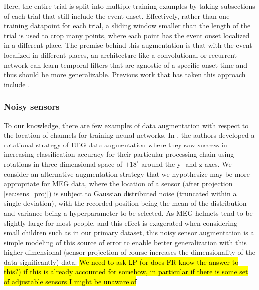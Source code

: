 \documentclass[utf8]{frontiersSCNS} %
\begin{document}
Here, the entire trial is split into multiple training examples by taking subsections of each trial that still include the event onset. Effectively, rather than one training datapoint for each trial, a sliding window smaller than the length of the trial is used to crop many points, where each point has the event onset localized in a different place. The premise behind this augmentation is that with the event localized in different places, an architecture like a convolutional or recurrent network can learn temporal filters that are agnostic of a specific onset time and thus should be more generalizable. Previous work that has taken this approach include \cite{Schirrmeister2017, Sun}. %



\subsubsection{Noisy sensors}

To our knowledge, there are few examples of data augmentation with respect to the location of channels for training neural networks. In \cite{Krell2017}, the authors developed a rotational strategy of EEG data augmentation where they saw success in increasing classification accuracy for their particular processing chain using rotations in three-dimensional space of $\pm 18^{\circ}$ around the y- and z-axes. We consider an alternative augmentation strategy that we hypothesize may be more appropriate for MEG data, where the location of a sensor (after projection \ref{sec:sens_proj}) is subject to Gaussian distributed noise (truncated within a single deviation), with the recorded position being the mean of the distribution and variance being a hyperparameter to be selected. As MEG helmets tend to be slightly large for most people, and this effect is exagerated when considering small children such as in our primary dataset, this noisy sensor augmentation is a simple modeling of this source of error to enable better generalization with this higher dimensional (sensor projection of course increases the dimensionality of the data significantly) data. \hl{We need to ask LP (or does FR know the answer to this?) if this is already accounted for somehow, in particular if there is some set of adjustable sensors I might be unaware of}
\end{document}
